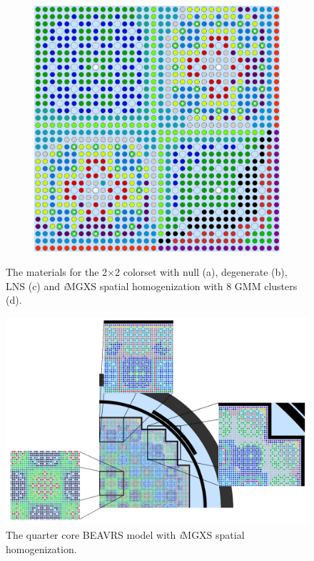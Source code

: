 \documentclass[12pt,twoside]{mitthesis-exec}
\begin{document}
\begin{figure}[h!]
\begin{subfigure}{0.47\textwidth}
  \caption{}
  \label{fig:reflector-lns}
\end{subfigure}%
\begin{subfigure}{0.47\textwidth}
  \centering
  \includegraphics[width=0.95\linewidth]{figures/unsupervised/geometries/with-features/8-clusters/combined/reflector}
  \caption{}
  \label{fig:reflector-8-clusters}
\end{subfigure}
\caption[Materials for the 2$\times$2 colorset]{The materials for the 2$\times$2 colorset with null (a), degenerate (b), LNS (c) and \textit{i}MGXS spatial homogenization with 8 GMM clusters (d).}
\label{fig:colorset-geometries}
\end{figure}

\clearpage

\begin{figure}[h!]
\centering
\includegraphics[width=\linewidth]{figures/unsupervised/geometries/with-features/8-clusters/combined/full-core-zoom}
\caption[Materials for the BEAVRS]{The quarter core BEAVRS model with \textit{i}MGXS spatial homogenization.}
\label{fig:full-core-8-clusters}
\end{figure}
\end{document}

